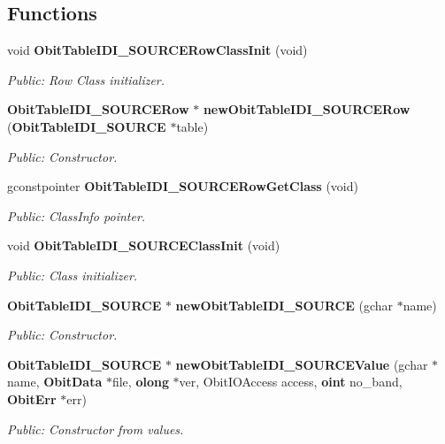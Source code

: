\subsection*{Functions}
\begin{CompactItemize}
\item 
void {\bf Obit\-Table\-IDI\_\-SOURCERow\-Class\-Init} (void)
\begin{CompactList}\small\item\em Public: Row Class initializer. \item\end{CompactList}\item 
{\bf Obit\-Table\-IDI\_\-SOURCERow} $\ast$ {\bf new\-Obit\-Table\-IDI\_\-SOURCERow} ({\bf Obit\-Table\-IDI\_\-SOURCE} $\ast$table)
\begin{CompactList}\small\item\em Public: Constructor. \item\end{CompactList}\item 
gconstpointer {\bf Obit\-Table\-IDI\_\-SOURCERow\-Get\-Class} (void)
\begin{CompactList}\small\item\em Public: Class\-Info pointer. \item\end{CompactList}\item 
void {\bf Obit\-Table\-IDI\_\-SOURCEClass\-Init} (void)
\begin{CompactList}\small\item\em Public: Class initializer. \item\end{CompactList}\item 
{\bf Obit\-Table\-IDI\_\-SOURCE} $\ast$ {\bf new\-Obit\-Table\-IDI\_\-SOURCE} (gchar $\ast$name)
\begin{CompactList}\small\item\em Public: Constructor. \item\end{CompactList}\item 
{\bf Obit\-Table\-IDI\_\-SOURCE} $\ast$ {\bf new\-Obit\-Table\-IDI\_\-SOURCEValue} (gchar $\ast$name, {\bf Obit\-Data} $\ast$file, {\bf olong} $\ast$ver, Obit\-IOAccess access, {\bf oint} no\_\-band, {\bf Obit\-Err} $\ast$err)
\begin{CompactList}\small\item\em Public: Constructor from values. \item\end{CompactList}\item 

\end{CompactItemize}
